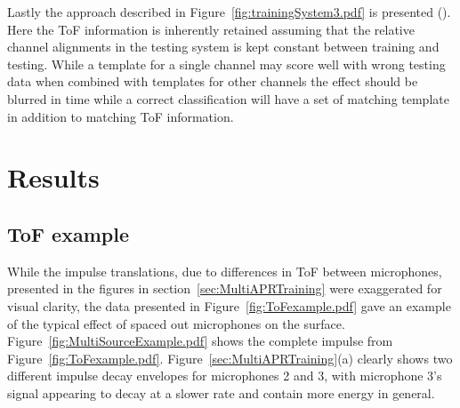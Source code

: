 Lastly the approach described in Figure~\ref{fig:trainingSystem3.pdf} is presented (). Here the ToF information is inherently retained assuming that the relative channel alignments in the testing system is kept constant between training and testing. While a template for a single channel may score well with wrong testing data when combined with templates for other channels the effect should be blurred in time while a correct classification will have a set of matching template in addition to matching ToF information.

\section{Results}\label{sec:MultiAPRResults}
\subsection{ToF example}
While the impulse translations, due to differences in ToF between microphones, presented in the figures in section~\ref{sec:MultiAPRTraining} were exaggerated for visual clarity, the data presented in Figure~\ref{fig:ToFexample.pdf} gave an example of the typical effect of spaced out microphones on the surface. Figure~\ref{fig:MultiSourceExample.pdf} shows the complete impulse from Figure~\ref{fig:ToFexample.pdf}. Figure~\ref{sec:MultiAPRTraining}(a) clearly shows two different impulse decay envelopes for microphones 2 and 3, with microphone 3's signal appearing to decay at a slower rate and contain more energy in general.

